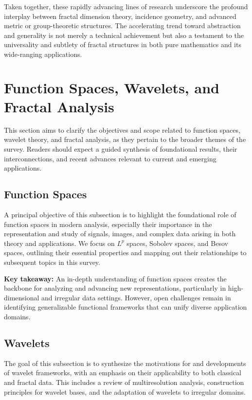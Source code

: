 \documentclass[sigconf]{acmart}
\begin{document}
Taken together, these rapidly advancing lines of research underscore the profound interplay between fractal dimension theory, incidence geometry, and advanced metric or group-theoretic structures. The accelerating trend toward abstraction and generality is not merely a technical achievement but also a testament to the universality and subtlety of fractal structures in both pure mathematics and its wide-ranging applications.

\section{Function Spaces, Wavelets, and Fractal Analysis}

This section aims to clarify the objectives and scope related to function spaces, wavelet theory, and fractal analysis, as they pertain to the broader themes of the survey. Readers should expect a guided synthesis of foundational results, their interconnections, and recent advances relevant to current and emerging applications.

\subsection{Function Spaces}

A principal objective of this subsection is to highlight the foundational role of function spaces in modern analysis, especially their importance in the representation and study of signals, images, and complex data arising in both theory and applications. We focus on $L^p$ spaces, Sobolev spaces, and Besov spaces, outlining their essential properties and mapping out their relationships to subsequent topics in this survey.

\textbf{Key takeaway:} An in-depth understanding of function spaces creates the backbone for analyzing and advancing new representations, particularly in high-dimensional and irregular data settings. However, open challenges remain in identifying generalizable functional frameworks that can unify diverse application domains.

\subsection{Wavelets}

The goal of this subsection is to synthesize the motivations for and developments of wavelet frameworks, with an emphasis on their applicability to both classical and fractal data. This includes a review of multiresolution analysis, construction principles for wavelet bases, and the adaptation of wavelets to irregular domains.
\end{document}
